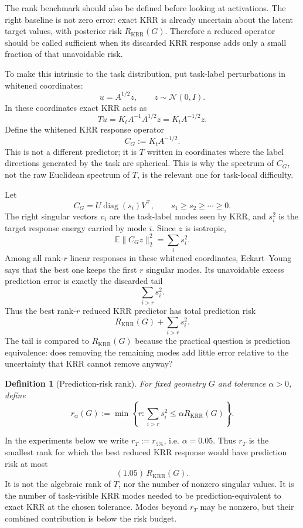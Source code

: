 \documentclass[11pt]{article}
\newtheorem{definition}{Definition}
\begin{document}
The rank benchmark should also be defined before looking at activations. The right baseline is not
zero error: exact KRR is already uncertain about the latent target values, with posterior risk
\(R_{\mathrm{KRR}}(G)\). Therefore a reduced operator should be called sufficient when its discarded
KRR response adds only a small fraction of that unavoidable risk.

To make this intrinsic to the task distribution, put task-label perturbations in whitened
coordinates:
\[
u=A^{1/2}z,\qquad z\sim\mathcal{N}(0,I).
\]
In these coordinates exact KRR acts as
\[
Tu=K_tA^{-1}A^{1/2}z
=K_tA^{-1/2}z.
\]
Define the whitened KRR response operator
\[
C_G:=K_tA^{-1/2}.
\]
This is not a different predictor; it is \(T\) written in coordinates where the label directions
generated by the task are spherical. This is why the spectrum of \(C_G\), not the raw Euclidean
spectrum of \(T\), is the relevant one for task-local difficulty.

Let
\[
C_G=U\operatorname{diag}(s_i)V^\top,
\qquad
s_1\ge s_2\ge\cdots\ge0.
\]
The right singular vectors \(v_i\) are the task-label modes seen by KRR, and \(s_i^2\) is the target
response energy carried by mode \(i\). Since \(z\) is isotropic,
\[
\mathbb{E}\|C_Gz\|_2^2=\sum_i s_i^2.
\]
Among all rank-\(r\) linear responses in these whitened coordinates, Eckart--Young says that the best
one keeps the first \(r\) singular modes. Its unavoidable excess prediction error is exactly the
discarded tail
\[
\sum_{i>r}s_i^2.
\]
Thus the best rank-\(r\) reduced KRR predictor has total prediction risk
\[
R_{\mathrm{KRR}}(G)+\sum_{i>r}s_i^2.
\]
The tail is compared to \(R_{\mathrm{KRR}}(G)\) because the practical question is prediction
equivalence: does removing the remaining modes add little error relative to the uncertainty that KRR
cannot remove anyway?

\begin{definition}[Prediction-risk rank]
For fixed geometry \(G\) and tolerance \(\alpha>0\), define
\[
r_\alpha(G)
:=
\min\left\{
r:
\sum_{i>r}s_i^2
\le
\alpha R_{\mathrm{KRR}}(G)
\right\}.
\]
\end{definition}

In the experiments below we write \(r_T:=r_{5\%}\), i.e. \(\alpha=0.05\). Thus \(r_T\) is the smallest
rank for which the best reduced KRR response would have prediction risk at most
\[
(1.05)\,R_{\mathrm{KRR}}(G).
\]
It is not the algebraic rank of \(T\), nor the number of nonzero singular values. It is the number of
task-visible KRR modes needed to be prediction-equivalent to exact KRR at the chosen tolerance.
Modes beyond \(r_T\) may be nonzero, but their combined contribution is below the risk budget.
\end{document}
